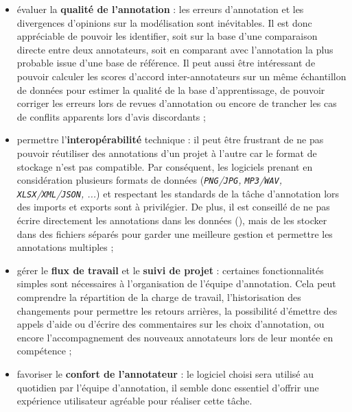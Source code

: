 \begin{itemize}
			\item évaluer la \textbf{qualité de l'annotation} :
				les erreurs d'annotation et les divergences d'opinions sur la modélisation sont inévitables.
				Il est donc appréciable de pouvoir les identifier, soit sur la base d'une comparaison directe entre deux annotateurs, soit en comparant avec l'annotation la plus probable issue d'une base de référence.
				Il peut aussi être intéressant de pouvoir calculer les scores d'accord inter-annotateurs sur un même échantillon de données pour estimer la qualité de la base d'apprentissage, de pouvoir corriger les erreurs lors de revues d'annotation ou encore de trancher les cas de conflits apparents lors d'avis discordants ;
			\item permettre l'\textbf{interopérabilité} technique :
				il peut être frustrant de ne pas pouvoir réutiliser des annotations d'un projet à l'autre car le format de stockage n'est pas compatible.
				Par conséquent, les logiciels prenant en considération plusieurs formats de données (\textit{\texttt{PNG}/\texttt{JPG}, \texttt{MP3}/\texttt{WAV}, \texttt{XLSX}/\texttt{XML}/\texttt{JSON}, ...}) et respectant les standards de la tâche d'annotation lors des imports et exports sont à privilégier.
				De plus, il est conseillé de ne pas écrire directement les annotations dans les données (), mais de les stocker dans des fichiers séparés pour garder une meilleure gestion et permettre les annotations multiples ;
			\item gérer le \textbf{flux de travail} et le \textbf{suivi de projet} :
				certaines fonctionnalités simples sont nécessaires à l'organisation de l'équipe d'annotation.
				Cela peut comprendre la répartition de la charge de travail, l'historisation des changements pour permettre les retours arrières, la possibilité d'émettre des appels d'aide ou d'écrire des commentaires sur les choix d'annotation, ou encore l'accompagnement des nouveaux annotateurs lors de leur montée en compétence ;
			\item favoriser le \textbf{confort de l'annotateur} :
				le logiciel choisi sera utilisé au quotidien par l'équipe d'annotation, il semble donc essentiel d'offrir une expérience utilisateur agréable pour réaliser cette tâche.

\end{itemize}
